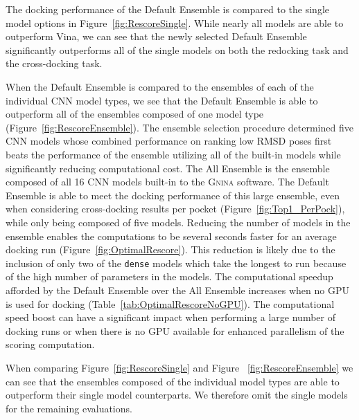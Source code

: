 \documentclass[linenumbers,doublespacing]{bmcart}
\begin{document}
The docking performance of the Default Ensemble is compared to the single model options in Figure~\ref{fig:RescoreSingle}. While nearly all models are able to outperform Vina, we can see that the newly selected Default Ensemble significantly outperforms all of the single models on both the redocking task and the cross-docking task.

When the Default Ensemble is compared to the ensembles of each of the individual CNN model types, we see that the Default Ensemble is able to outperform all of the ensembles composed of one model type (Figure~\ref{fig:RescoreEnsemble}). The ensemble selection procedure determined five CNN models whose combined performance on ranking low RMSD poses first beats the performance of the ensemble utilizing all of the built-in models while significantly reducing computational cost. The All Ensemble is the ensemble composed of all 16 CNN models built-in to the \textsc{Gnina} software. The Default Ensemble is able to meet the docking performance of this large ensemble, even when considering cross-docking results per pocket (Figure~\ref{fig:Top1_PerPock}), while only being composed of five models. Reducing the number of models in the ensemble enables the computations to be several seconds faster for an average docking run (Figure~\ref{fig:OptimalRescore}). This reduction is likely due to the inclusion of only two of the \texttt{dense} models which take the longest to run because of the high number of parameters in the models. The computational speedup afforded by the Default Ensemble over the All Ensemble increases when no GPU is used for docking (Table~\ref{tab:OptimalRescoreNoGPU}). The computational speed boost can have a significant impact when performing a large number of docking runs or when there is no GPU available for enhanced parallelism of the scoring computation.

When comparing Figure~\ref{fig:RescoreSingle} and Figure ~\ref{fig:RescoreEnsemble} we can see that the ensembles composed of the individual model types are able to outperform their single model counterparts. We therefore omit the single models for the remaining evaluations.
\end{document}
